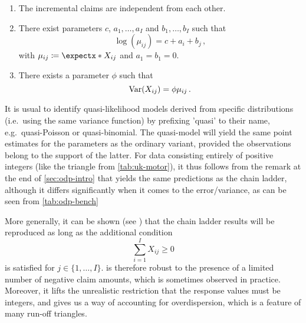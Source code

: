 \documentclass[a4paper]{book}
\begin{document}
\begin{model} \leavevmode \label{model:odp}
  \begin{enumerate}[label=\bf{\textup{(}ODP\arabic*\textup{)}},ref=\textup{(}ODP\arabic*\textup{)}, wide]
    \item The incremental claims are independent from each other.
    \item There exist parameters $c$, $a_1, \dots, a_I$ and $b_1, \dots, b_I$ such that
          \begin{equation}
            \log(\mu_{ij}) = c + a_i + b_j \,,
          \end{equation}
          with $\mu_{ij} \coloneqq \expect{X_{ij}}$ and $a_1 = b_1 = 0$.
    \item There exists a parameter $\phi$ such that
          \begin{equation}
            \var{X_{ij}} = \phi \mu_{ij} \,.
          \end{equation}
  \end{enumerate}
\end{model}

It is usual to identify quasi-likelihood models derived from specific distributions (i.e.\ using the same variance function) by prefixing 'quasi' to their name, e.g.\ quasi-Poisson or quasi-binomial. The quasi-model will yield the same point estimates for the parameters as the ordinary variant, provided the observations belong to the support of the latter. For data consisting entirely of positive integers (like the triangle from \cref{tab:uk-motor}), it thus follows from the remark at the end of \cref{sec:odp-intro} that  yields the same predictions as the chain ladder, although it differs significantly when it comes to the error/variance, as can be seen from \cref{tab:odp-bench}

More generally, it can be shown (see \cite[Section 2]{renshaw}) that the chain ladder results will be reproduced as long as the additional condition
\begin{equation}
  \sum_{i = 1}^I X_{ij} \geq 0
\end{equation}
is satisfied for $j \in \{ 1, \dots, I \}$.  is therefore robust to the presence of a limited number of negative claim amounts, which is sometimes observed in practice. Moreover, it lifts the unrealistic restriction that the response values must be integers, and gives us a way of accounting for overdispersion, which is a feature of many run-off triangles.
\end{document}
